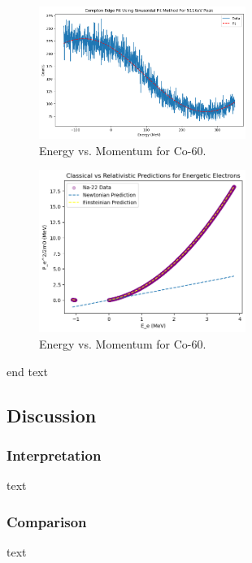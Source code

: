 \documentclass[12pt]{article}
\begin{document}
        \begin{figure}[h!]
                \centering
                \includegraphics[width=0.6\textwidth]{./img/plots/Graph3.png}
                \caption{Energy vs. Momentum for Co-60.}
        \end{figure}
        
        \begin{figure}[h!]
                \centering
                \includegraphics[width=0.6\textwidth]{./img/plots/Graph1.png}
                \caption{Energy vs. Momentum for Co-60.}
        \end{figure}
                        
        end text
                        
        \subsection{Discussion}
                \subsubsection{Interpretation}
                text
                \subsubsection{Comparison}
                text

\vfill
\end{document}
